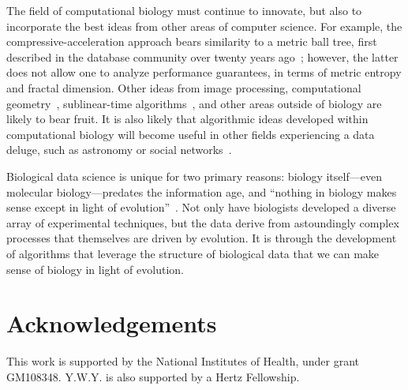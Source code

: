 \documentclass{acm_proc_article-sp}
\begin{document}
The field of computational biology must continue to innovate, but also to 
incorporate the best ideas from other areas of computer science.
For example, the compressive-acceleration approach bears similarity to a metric 
ball tree, first described in the database community over twenty years 
ago~\cite{uhlmann1991satisfying};
however, the latter does not allow one to analyze performance guarantees, 
in terms of metric entropy and fractal dimension.
Other ideas from image processing, computational geometry~\cite{indyk1998approximate}, sublinear-time algorithms~\cite{rubinfeld2011sublinear}, and other areas 
outside of biology are likely to bear fruit. 
It is also likely that algorithmic ideas developed within computational biology
will become useful in other fields experiencing a data deluge, such as astronomy
or social networks~\cite{stephens2015big}.

Biological data science is unique for two primary reasons: biology itself---even molecular 
biology---predates the information age, and 
``nothing in biology makes sense except in light of evolution''~\cite{dobzhansky1973nothing}.
Not only have biologists developed a diverse array of experimental techniques, but the data
derive from astoundingly complex processes that themselves are driven by evolution.
It is through the development of algorithms that leverage the structure of biological data that we can
make sense of biology in light of evolution.

\section{Acknowledgements}
This work is supported by the National Institutes of Health, under
grant GM108348.
Y.W.Y. is also supported by a Hertz Fellowship.






\end{document}
